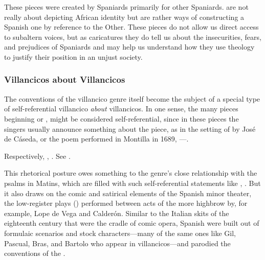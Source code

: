 These pieces were created by Spaniards primarily for other Spaniards.
 are not really about depicting African identity but
are rather ways of constructing a Spanish one by reference to the Other.
These pieces do not allow us direct access to subaltern voices, but as
caricatures they do tell us about the insecurities, fears, and prejudices of
Spaniards and may help us understand how they use theology to justify their
position in an unjust society.

\subsubsection{Villancicos about Villancicos}

The conventions of the villancico genre itself become the subject of a special
type of self-referential villancico \emph{about} villancicos.
In one sense, the many pieces beginning  or , might be considered self-referential, since in these pieces the
singers usually announce something about the piece, as in the setting of
 by José de Cáseda, or the poem performed in
Montilla in 1689, ---.%
\begin{Footnote}
    Respectively, , \autocite[116 (no signature
    listed)]{BNE:VCs17C}.
    See \autocite{LeGuin:Tonadilla}.
\end{Footnote}
This rhetorical posture owes something to the genre's close
relationship with the psalms in Matins, which are filled with such
self-referential statements like ,
.
But it also draws on the comic and satirical elements of the Spanish minor
theater, the low-register plays () performed between acts of
the more highbrow  by, for example, Lope de Vega and Calderón.%
    \Autocite{Cotarelo:Entremeses}
Similar to the Italian  skits of the eighteenth
century that were the cradle of comic opera, Spanish  were
built out of formulaic scenarios and stock characters---many of the same ones
like Gil, Pascual, Bras, and Bartolo who appear in villancicos---and parodied
the conventions of the .

